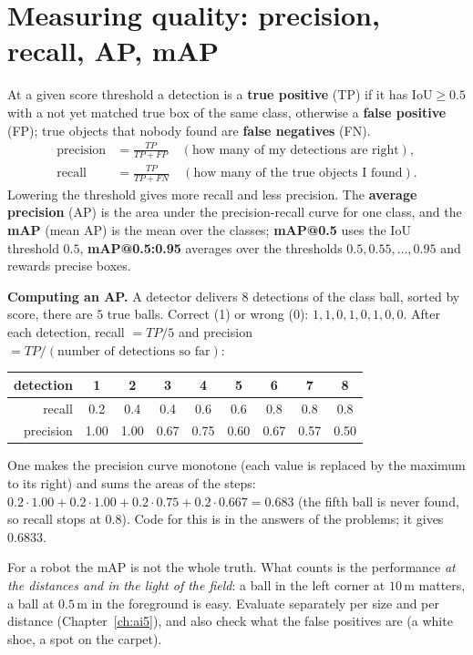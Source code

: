 \section*{Measuring quality: precision, recall, AP, mAP}
At a given score threshold a detection is a \textbf{true positive} (TP) if it has $\mathrm{IoU}\ge0.5$ with a not yet matched true box of the same class, otherwise a \textbf{false positive} (FP); true objects that nobody found are \textbf{false negatives} (FN).
\begin{align*}
\text{precision}&=\frac{TP}{TP+FP}\quad(\text{how many of my detections are right}),\\
\text{recall}&=\frac{TP}{TP+FN}\quad(\text{how many of the true objects I found}).
\end{align*}
Lowering the threshold gives more recall and less precision. The \textbf{average precision} (AP) is the area under the precision-recall curve for one class, and the \textbf{mAP} (mean AP) is the mean over the classes; \textbf{mAP@0.5} uses the IoU threshold $0.5$, \textbf{mAP@0.5:0.95} averages over the thresholds $0.5,0.55,\dots,0.95$ and rewards precise boxes.
\begin{example}
\textbf{Computing an AP.} A detector delivers $8$ detections of the class ball, sorted by score, there are $5$ true balls. Correct (1) or wrong (0): $1,1,0,1,0,1,0,0$. After each detection, recall $=TP/5$ and precision $=TP/(\text{number of detections so far})$:
\begin{center}
\renewcommand{\arraystretch}{1.15}
\begin{tabular}{r|cccccccc}
detection & 1&2&3&4&5&6&7&8\\ \hline
recall & 0.2&0.4&0.4&0.6&0.6&0.8&0.8&0.8\\
precision & 1.00&1.00&0.67&0.75&0.60&0.67&0.57&0.50\\
\end{tabular}
\end{center}
One makes the precision curve monotone (each value is replaced by the maximum to its right) and sums the areas of the steps: $0.2\cdot1.00+0.2\cdot1.00+0.2\cdot0.75+0.2\cdot0.667=\mathbf{0.683}$ (the fifth ball is never found, so recall stops at $0.8$). Code for this is in the answers of the problems; it gives $0.6833$.
\end{example}
For a robot the mAP is not the whole truth. What counts is the performance \emph{at the distances and in the light of the field}: a ball in the left corner at $10$\,m matters, a ball at $0.5$\,m in the foreground is easy. Evaluate separately per size and per distance (Chapter~\ref{ch:ai5}), and also check what the false positives are (a white shoe, a spot on the carpet).

